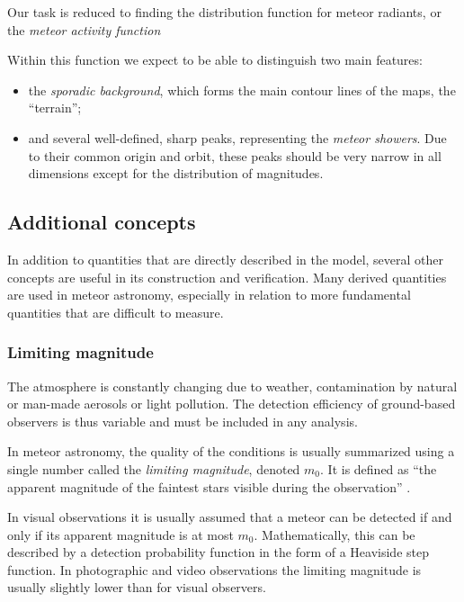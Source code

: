             Our task is reduced to finding the distribution function for meteor radiants, or the \emph{meteor activity function}

            Within this function we expect to be able to distinguish two main features:
            \begin{itemize}
                \item the \emph{sporadic background}, which forms the main contour lines of the maps, the ``terrain'';
                \item and several well-defined, sharp peaks, representing the \emph{meteor showers}.
                    Due to their common origin and orbit, these peaks should be very narrow in all dimensions
                    except for the distribution of magnitudes.
            \end{itemize}

    \subsection{Additional concepts} \label{msa}
        In addition to quantities that are directly described in the model, several other concepts are useful
        in its construction and verification. Many derived quantities are used in meteor astronomy,
        especially in relation to more fundamental quantities that are difficult to measure.

        \subsubsection{Limiting magnitude} \label{msam}
            The atmosphere is constantly changing due to weather, contamination
            by natural or man-made aerosols or light pollution. The detection efficiency
            of ground-based observers is thus variable and must be included in any analysis.

            In meteor astronomy, the quality of the conditions is usually summarized
            using a single number called the \emph{limiting magnitude}, denoted $m_0$.
            It is defined as ``the apparent magnitude of the faintest stars visible during the observation'' \citep{imo-glossary}.

            In visual observations it is usually assumed that a meteor can be detected if and only if
            its apparent magnitude is at most $m_0$. Mathematically, this can be described by a
            detection probability function in the form of a Heaviside step function.
            In photographic and video observations the limiting magnitude is usually slightly lower than for visual observers.

